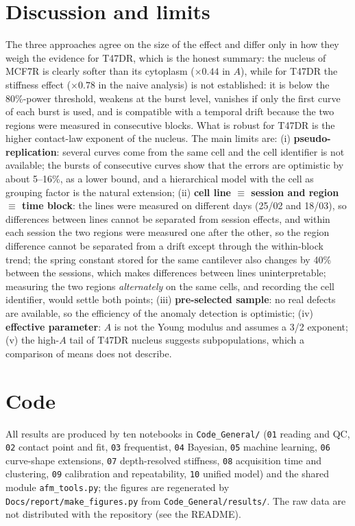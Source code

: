 \documentclass[reprint,nofootinbib,amsmath,amssymb,aps,floatfix]{revtex4-2}
\begin{document}
\section{Discussion and limits}
The three approaches agree on the size of the effect and differ only in how they weigh the evidence for T47DR, which is the honest summary: the nucleus of MCF7R is clearly softer than its
cytoplasm ($\times0.44$ in $A$), while for T47DR the stiffness effect ($\times0.78$ in the naive analysis) is not established: it is below the 80\%-power threshold, weakens at the burst level, vanishes if only the first curve of each burst is used, and is compatible with a temporal drift because the two regions were measured in consecutive blocks. What is robust for T47DR is the higher contact-law exponent of the nucleus.
The main limits are:
(i) \textbf{pseudo-replication}: several curves come from the same cell and the cell identifier is not available; the bursts of consecutive curves show that the errors are optimistic by about 5--16\%, as a lower bound, and a hierarchical model with the cell as grouping factor is the natural extension;
(ii) \textbf{cell line $\equiv$ session and region $\equiv$ time block}: the lines were measured on different days (25/02 and 18/03), so differences between lines cannot be separated from session effects, and within each session the two regions were measured one after the other, so the region difference cannot be separated from a drift except through the within-block trend; the spring constant stored for the same cantilever also changes by 40\% between the sessions, which makes differences between lines uninterpretable; measuring the two regions \emph{alternately} on the same cells, and recording the cell identifier, would settle both points;
(iii) \textbf{pre-selected sample}: no real defects are available, so the efficiency of the anomaly detection is optimistic;
(iv) \textbf{effective parameter}: $A$ is not the Young modulus and assumes a 3/2 exponent;
(v) the high-$A$ tail of T47DR nucleus suggests subpopulations, which a comparison of means does not describe.

\section{Code}\label{sec:code}
All results are produced by ten notebooks in \texttt{Code\_General/} (\texttt{01} reading and QC, \texttt{02} contact point and fit, \texttt{03} frequentist, \texttt{04} Bayesian,
\texttt{05} machine learning, \texttt{06} curve-shape extensions, \texttt{07} depth-resolved stiffness, \texttt{08} acquisition time and clustering, \texttt{09} calibration and repeatability, \texttt{10} unified model) and the shared module \texttt{afm\_tools.py}; the figures are regenerated by \texttt{Docs/report/make\_figures.py} from \texttt{Code\_General/results/}.
The raw data are not distributed with the repository (see the README).
\end{document}

